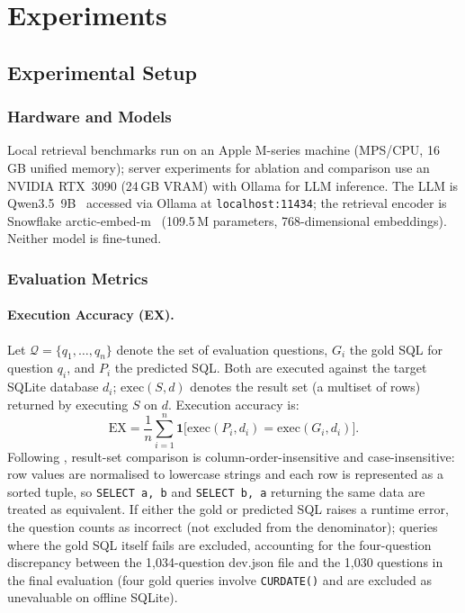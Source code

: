 \section{Experiments}
\label{sec:experiments}

\subsection{Experimental Setup}

\subsubsection{Hardware and Models}

Local retrieval benchmarks run on an Apple M-series machine (MPS/CPU, 16\,GB
unified memory); server experiments for ablation and comparison use an
NVIDIA RTX~3090 (24\,GB VRAM) with Ollama for LLM inference.
The LLM is Qwen3.5~9B~\citep{qwen2025} accessed via Ollama at
\texttt{localhost:11434}; the retrieval encoder is Snowflake
arctic-embed-m~\citep{merrick2024arctic} (109.5\,M parameters,
768-dimensional embeddings).
Neither model is fine-tuned.

\subsubsection{Evaluation Metrics}
\label{sec:metrics}

\paragraph{Execution Accuracy (EX).}
Let $\mathcal{Q} = \{q_1, \ldots, q_n\}$ denote the set of evaluation
questions, $G_i$ the gold SQL for question $q_i$, and $P_i$ the
predicted SQL.
Both are executed against the target SQLite database $d_i$;
$\text{exec}(S, d)$ denotes the result set (a multiset of rows)
returned by executing $S$ on $d$.
Execution accuracy is:
\begin{equation}
  \mathrm{EX} = \frac{1}{n}\sum_{i=1}^{n}
  \mathbf{1}\bigl[\text{exec}(P_i, d_i) = \text{exec}(G_i, d_i)\bigr].
  \label{eq:ex}
\end{equation}
Following \citet{gao2023dailsql}, result-set comparison is
column-order-insensitive and case-insensitive: row values are
normalised to lowercase strings and each row is represented as a
sorted tuple, so \texttt{SELECT a, b} and \texttt{SELECT b, a}
returning the same data are treated as equivalent.
If either the gold or predicted SQL raises a runtime error, the
question counts as incorrect (not excluded from the denominator);
queries where the gold SQL itself fails are excluded, accounting for
the four-question discrepancy between the 1{,}034-question dev.json
file and the 1{,}030 questions in the final evaluation
(four gold queries involve \texttt{CURDATE()} and are excluded as
unevaluable on offline SQLite).

